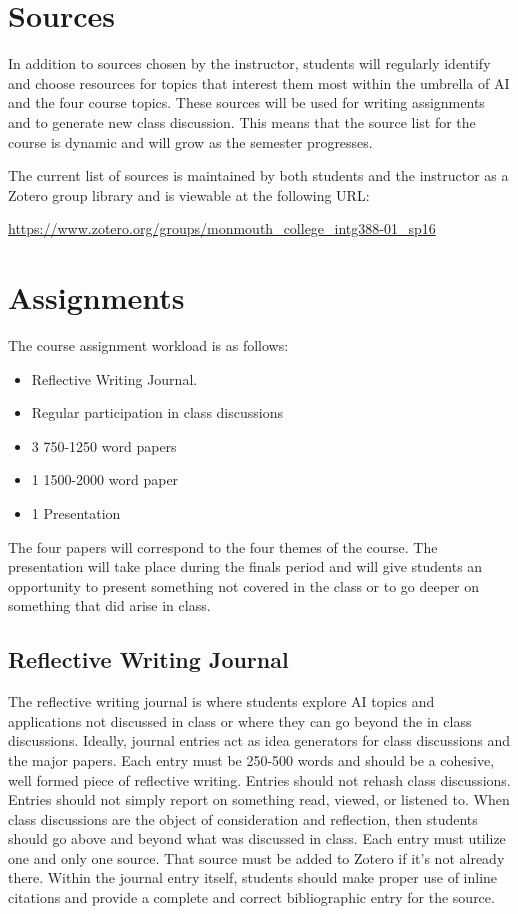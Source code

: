 \documentclass[nobib]{tufte-handout}
\begin{document}
\section{Sources}

In addition to sources chosen by the instructor, students will regularly identify and choose resources for topics that interest them most within the umbrella of AI and the four course topics. These sources will be used for writing assignments and to generate new class discussion.  This means that the source list for the course is dynamic and will grow as the semester progresses.

The current list of sources is maintained by both students and the instructor as a Zotero group library and is viewable at the following URL:
\vspace{.2in}

\begin{footnotesize}
\url{https://www.zotero.org/groups/monmouth_college_intg388-01_sp16}
\end{footnotesize}


\section{Assignments}

The course assignment workload is as follows:
\begin{itemize}
\item Reflective Writing Journal.
\item Regular participation in class discussions
\item 3 750-1250 word papers
\item 1 1500-2000 word paper
\item 1 Presentation
\end{itemize}
The four papers will correspond to the four themes of the course. The presentation will take place during the finals period and will give students an opportunity to present something not covered in the class or to go deeper on something that did arise in class.

\subsection{Reflective Writing Journal}

The reflective writing journal is where students explore AI topics and applications not discussed in class or where they can go beyond the in class discussions. Ideally, journal entries act as idea generators for class discussions and the major papers. Each entry must be 250-500 words and should be a cohesive, well formed piece of reflective writing. Entries should not rehash class discussions. Entries should not simply report on something read, viewed, or listened to. When class discussions are the object of consideration and reflection, then students should go above and beyond what was discussed in class. Each entry must utilize one and only one source. That source must be added to Zotero if it's not already there. Within the journal entry itself, students should make proper use of inline citations and provide a complete and correct bibliographic entry for the source.
\end{document}
